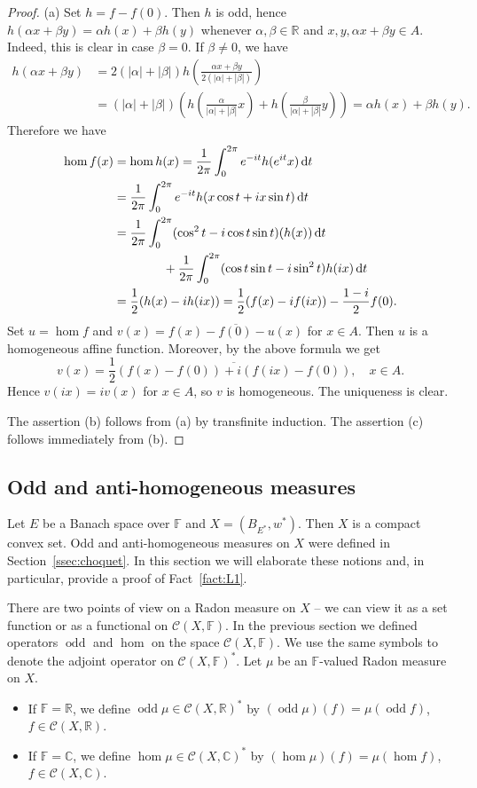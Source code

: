 \documentclass{amsart}
\numberwithin{equation}{section}
\theoremstyle{definition}
\def\C{\mathcal C}
\def\ce{\mathbb C}
\def\ef{\mathbb F}
\def\er{\mathbb R}
\def\ov{\overline}
\def\hom{\operatorname{hom}}
\def\odd{\operatorname{odd}}
\def\di{\,\mbox{\rm d}}
\newcommand{\abs}[1]{\left| #1  \right|}
\begin{document}
\begin{proof} (a) Set $h=f-f(0)$. Then $h$ is odd, hence $h(\alpha x+\beta y)=\alpha h(x)+\beta h(y)$ whenever $\alpha,\beta\in \er$ and $x,y,\alpha x+\beta y\in A$. Indeed, this is clear in case $\beta=0$. If $\beta\ne 0$, we have
$$\begin{aligned}h(\alpha x+\beta y)&=2(\abs{\alpha}+\abs{\beta})h\left(\frac{\alpha x+\beta y}{2(\abs{\alpha}+\abs{\beta})}\right)\\&
=(\abs{\alpha}+\abs{\beta})\left(h\left(\frac{\alpha}{\abs{\alpha}+\abs{\beta}}x\right)+h\left(\frac{\beta}{\abs{\alpha}+\abs{\beta}}y\right)\right)=\alpha h(x)+\beta h(y).\end{aligned}$$
 Therefore we have
$$\begin{aligned}
\hom f(x)&=\hom h(x)=\frac1{2\pi}\int_0^{2\pi}e^{-it}h(e^{it}x)\di t
\\&=\frac1{2\pi}\int_0^{2\pi} e^{-it}h(x\cos t+ix\sin t)\di t
\\&=\frac1{2\pi}\int_0^{2\pi} (\cos^2t-i\cos t\sin t)(h(x)) \di t
\\&\qquad\qquad+\frac1{2\pi}\int_0^{2\pi} (\cos t\sin t-i\sin^2t)h(ix)\di t
\\&=\frac12( h(x) - ih(ix))
=\frac12(f(x)-if(ix))-\frac{1-i}2f(0).
\end{aligned}$$
Set $u=\hom f$ and $v(x)=\ov{f(x)-f(0)-u(x)}$ for $x\in A$. Then $u$ is a homogeneous affine function.
Moreover, by the above formula we get
$$v(x)=\frac12\ov{(f(x)-f(0))+i(f(ix)-f(0))}, \quad x\in A.$$
 Hence
 $v(ix)=iv(x)$ for $x\in A$, so $v$ is homogeneous. The uniqueness is clear.

The assertion (b) follows from (a) by transfinite induction.
The assertion (c) follows immediately from (b).
\end{proof}

\subsection{Odd and anti-homogeneous measures}\label{ssec:miry}

Let $E$ be a Banach space over $\ef$ and $X=(B_{E^*},w^*)$. Then $X$ is a compact convex set. Odd and anti-homogeneous measures on $X$ were defined in Section~\ref{ssec:choquet}. In this section we will elaborate these notions and, in particular, provide a proof of Fact~\ref{fact:L1}.

There are two points of view on a Radon measure on $X$ -- we can view it as a set function or as a functional on $\C(X,\ef)$.
In the previous section we defined operators $\odd$ and $\hom$ on the space $\C(X,\ef)$. We use the same symbols to denote
the adjoint operator on $\C(X,\ef)^*$. Let $\mu$ be an $\ef$-valued Radon measure on $X$.
 \begin{itemize}
	\item If $\ef=\er$, we define $\odd\mu\in \C(X,\er)^*$ by $(\odd\mu)(f)=\mu(\odd f)$, $f\in\C(X,\er)$.
	\item If $\ef=\ce$, we define $\hom\mu\in \C(X,\ce)^*$ by $(\hom \mu)(f)=\mu(\hom f)$, $f\in \C(X,\ce)$.
\end{itemize}
\end{document}
